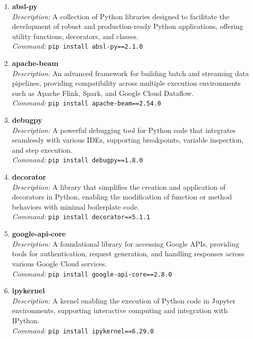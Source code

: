 \begin{enumerate}
	\item \textbf{absl-py} \\
	\emph{Description:} A collection of Python libraries designed to facilitate the development of robust and production-ready Python applications, offering utility functions, decorators, and classes. \\
	\emph{Command:} \texttt{pip install absl-py==2.1.0}
	
	\item \textbf{apache-beam} \\
	\emph{Description:} An advanced framework for building batch and streaming data pipelines, providing compatibility across multiple execution environments such as Apache Flink, Spark, and Google Cloud Dataflow. \\
	\emph{Command:} \texttt{pip install apache-beam==2.54.0}
	
	\item \textbf{debugpy} \\
	\emph{Description:} A powerful debugging tool for Python code that integrates seamlessly with various IDEs, supporting breakpoints, variable inspection, and step execution. \\
	\emph{Command:} \texttt{pip install debugpy==1.8.0}
	
	\item \textbf{decorator} \\
	\emph{Description:} A library that simplifies the creation and application of decorators in Python, enabling the modification of function or method behaviors with minimal boilerplate code. \\
	\emph{Command:} \texttt{pip install decorator==5.1.1}
	
	\item \textbf{google-api-core} \\
	\emph{Description:} A foundational library for accessing Google APIs, providing tools for authentication, request generation, and handling responses across various Google Cloud services. \\
	\emph{Command:} \texttt{pip install google-api-core==2.8.0}
	
	\item \textbf{ipykernel} \\
	\emph{Description:} A kernel enabling the execution of Python code in Jupyter environments, supporting interactive computing and integration with IPython. \\
	\emph{Command:} \texttt{pip install ipykernel==6.29.0}
	

\end{enumerate}
